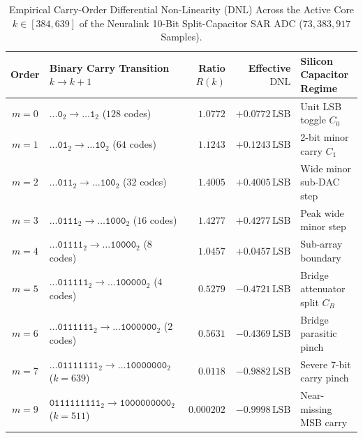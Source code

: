 \documentclass[11pt,letterpaper]{article}
\theoremstyle{definition}
\begin{document}
\begin{table}[htbp]
\centering
\caption{Empirical Carry-Order Differential Non-Linearity (DNL) Across the Active Core $k \in [384, 639]$ of the Neuralink 10-Bit Split-Capacitor SAR ADC ($73{,}383{,}917$ Samples).}
\label{tab:sar_dnl}
\footnotesize
\setlength{\tabcolsep}{3.5pt}
\begin{tabular}{@{}clrrl@{}}
\toprule
\textbf{Order} & \textbf{Binary Carry Transition $k \to k+1$} & \textbf{Ratio $R(k)$} & \textbf{Effective $\mathrm{DNL}$} & \textbf{Silicon Capacitor Regime} \\
\midrule
$m = 0$ & $\mathtt{\dots 0}_2 \to \mathtt{\dots 1}_2$ ($128$ codes) & $1.0772$ & $+0.0772\,\text{LSB}$ & Unit LSB toggle $C_0$ \\
$m = 1$ & $\mathtt{\dots 01}_2 \to \mathtt{\dots 10}_2$ ($64$ codes) & $1.1243$ & $+0.1243\,\text{LSB}$ & 2-bit minor carry $C_1$ \\
$m = 2$ & $\mathtt{\dots 011}_2 \to \mathtt{\dots 100}_2$ ($32$ codes) & $1.4005$ & $+0.4005\,\text{LSB}$ & Wide minor sub-DAC step \\
$m = 3$ & $\mathtt{\dots 0111}_2 \to \mathtt{\dots 1000}_2$ ($16$ codes) & $1.4277$ & $+0.4277\,\text{LSB}$ & Peak wide minor step \\
$m = 4$ & $\mathtt{\dots 01111}_2 \to \mathtt{\dots 10000}_2$ ($8$ codes) & $1.0457$ & $+0.0457\,\text{LSB}$ & Sub-array boundary \\
$m = 5$ & $\mathtt{\dots 011111}_2 \to \mathtt{\dots 100000}_2$ ($4$ codes) & $0.5279$ & $-0.4721\,\text{LSB}$ & Bridge attenuator split $C_B$ \\
$m = 6$ & $\mathtt{\dots 0111111}_2 \to \mathtt{\dots 1000000}_2$ ($2$ codes) & $0.5631$ & $-0.4369\,\text{LSB}$ & Bridge parasitic pinch \\
$m = 7$ & $\mathtt{\dots 01111111}_2 \to \mathtt{\dots 10000000}_2$ ($k = 639$) & $0.0118$ & $-0.9882\,\text{LSB}$ & Severe 7-bit carry pinch \\
$m = 9$ & $\mathtt{0111111111}_2 \to \mathtt{1000000000}_2$ ($k = 511$) & $0.000202$ & $-0.9998\,\text{LSB}$ & Near-missing MSB carry \\
\bottomrule
\end{tabular}
\end{table}
\end{document}
